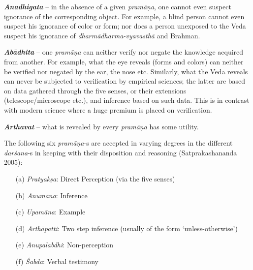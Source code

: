 {{\sl\bfseries Anadhigata}\relax}  -- in the absence of a given {\sl pramāṇa}, one cannot even suspect ignorance of the corresponding object. For example, a blind person cannot even suspect his ignorance of color or form; nor does a person unexposed to the Veda suspect his ignorance of {\sl dharmādharma-vyavasthā} and Brahman.

{{\sl\bfseries Abādhita}\relax} -- one {\sl pramāṇa} can neither verify nor negate the knowledge acquired from another. For example, what the eye reveals (forms and colors) can neither be veriﬁed nor negated by the ear, the nose etc. Similarly, what the Veda reveals can never be subjected to veriﬁcation by empirical sciences; the latter are based on data gathered through the ﬁve senses, or their extensions (telescope/microscope etc.), and inference based on such data. This is in contrast with modern science where a huge premium is placed on veriﬁcation.

{{\sl\bfseries Arthavat}\relax} -- what is revealed by every {\sl pramāṇa} has some utility. 

The following six {\sl pramāṇa}-s are accepted in varying degrees in the different {\sl darśana}-s in keeping with their disposition and reasoning (Satprakashananda 2005):
\begin{itemize}
\itemsep=0pt
\item[(a)] {\sl Pratyakṣa}: Direct Perception (via the five senses)
\item[(b)] {\sl Anumāna}: Inference
\item[(c)] {\sl Upamāna}: Example
\item[(d)] {\sl Arthāpatti}: Two step inference (usually of the form `unless-otherwise')
\item[(e)] {\sl Anupalabdhi}: Non-perception
\item[(f)] {\sl Śabda}: Verbal testimony
\end{itemize}


